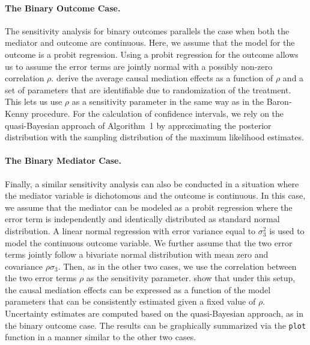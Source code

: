 \documentclass[11pt,letterpaper]{article}
\theoremstyle{plain}
\begin{document}
\paragraph{The Binary Outcome Case.}

The sensitivity analysis for binary outcomes parallels the case when
both the mediator and outcome are continuous.  Here, we assume that
the model for the outcome is a probit regression. Using a probit
regression for the outcome allows us to assume the error terms are
jointly normal with a possibly non-zero correlation $\rho$.
\citet{imai:keel:ting:10} derive the average causal mediation effects
as a function of $\rho$ and a set of parameters that are identifiable
due to randomization of the treatment. This lets us use $\rho$ as a
sensitivity parameter in the same way as in the Baron-Kenny procedure.
For the calculation of confidence intervals, we rely on the
quasi-Bayesian approach of Algorithm~1 by approximating the posterior
distribution with the sampling distribution of the maximum likelihood
estimates.


\paragraph{The Binary Mediator Case.}

Finally, a similar sensitivity analysis can also be conducted in a
situation where the mediator variable is dichotomous and the outcome
is continuous.  In this case, we assume that the mediator can be
modeled as a probit regression where the error term is independently
and identically distributed as standard normal distribution.  A linear
normal regression with error variance equal to $\sigma_3^2$ is used to
model the continuous outcome variable.  We further assume that the two
error terms jointly follow a bivariate normal distribution with mean
zero and covariance $\rho\sigma_3$.  Then, as in the other two cases,
we use the correlation between the two error terms $\rho$ as the
sensitivity parameter.  \citet{imai:keel:ting:10} show that under this
setup, the causal mediation effects can be expressed as a function of
the model parameters that can be consistently estimated given a fixed
value of $\rho$.  Uncertainty estimates are computed based on the
quasi-Bayesian approach, as in the binary outcome case.  The results
can be graphically summarized via the \texttt{plot} function in a
manner similar to the other two cases.
\end{document}

